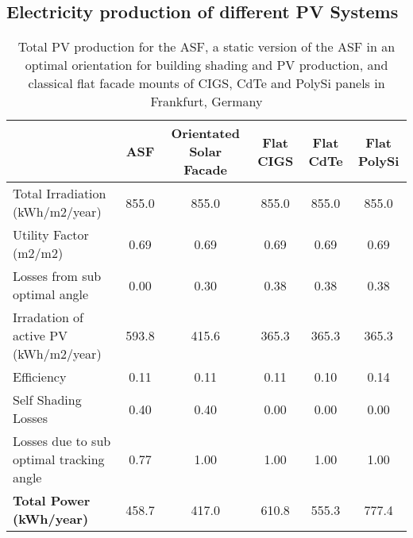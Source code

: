 \subsection{Electricity production of different PV Systems}
\begin{landscape}
\begin{table}
\begin{tabular}{lccccc}
\hline
                                         &  ASF & Orientated Solar Facade & Flat  CIGS & Flat  CdTe & Flat  PolySi \\
\hline
Total Irradiation (kWh/m2/year)          & 855.0 & 855.0 & 855.0 & 855.0 & 855.0 \\
Utility Factor (m2/m2)                   & 0.69  & 0.69  & 0.69  & 0.69  & 0.69  \\
Losses from sub optimal angle            & 0.00  & 0.30  & 0.38  & 0.38  & 0.38  \\
Irradation of active PV  (kWh/m2/year)   & 593.8 & 415.6 & 365.3 & 365.3 & 365.3 \\
Efficiency                               & 0.11  & 0.11  & 0.11  & 0.10  & 0.14  \\
Self Shading Losses                      & 0.40  & 0.40  & 0.00  & 0.00  & 0.00  \\
Losses due to sub optimal tracking angle & 0.77  & 1.00  & 1.00  & 1.00  & 1.00  \\
\textbf{Total Power (kWh/year)}          & 458.7 & 417.0 & 610.8 & 555.3 & 777.4 \\
\hline
\end{tabular}
\caption{Total PV production for the ASF, a static version of the ASF in an optimal orientation for building shading and PV production, and classical flat facade mounts of CIGS, CdTe and PolySi panels in Frankfurt, Germany}
\label{tab:PVCalc}
\end{table}
\end{landscape}

